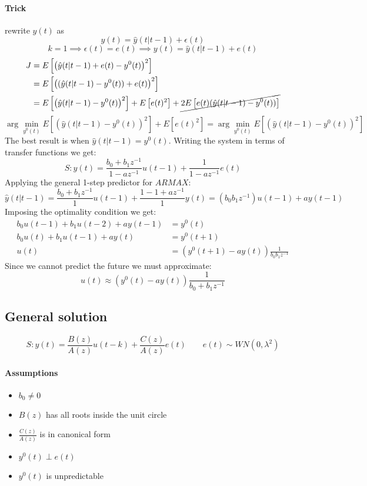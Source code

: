 \documentclass{article}
\begin{document}
\paragraph{Trick} rewrite $y(t)$ as
\[
y(t)=\hat{y}(t|t-1)+\epsilon(t)
\]
\[
k=1 
\implies \epsilon(t)=e(t) 
\implies y(t)=\hat{y}(t|t-1)+e(t)
\]
\begin{align*}
J&=E\left[\left(\hat{y}(t|t-1)+e(t)-y^0(t)\right)^2\right]\\
&=E\left[\left((\hat{y}(t|t-1)-y^0(t))+e(t)\right)^2\right]\\
&=E\left[\left(\hat{y}(t|t-1)-y^0(t)\right)^2\right]
+E\left[e(t)^2\right]
+\cancel{
2E\left[e(t)(\hat{y}(t|t-1)-y^0(t))\right]
}\\
\end{align*}
\[
\arg \min_{y^0(t)} E\left[\left(\hat{y}(t|t-1)-y^0(t)\right)^2\right]
+E\left[e(t)^2\right]
=
\arg \min_{y^0(t)} E\left[\left(\hat{y}(t|t-1)-y^0(t)\right)^2\right]
\]
The best result is when $\hat{y}(t|t-1)=y^0(t)$. Writing the system in terms of transfer functions we get:
\[
S:y(t)=
\frac{b_0+b_1z^{-1}}{1-az^{-1}}
u(t-1)
+
\frac{1}{1-az^{-1}}e(t)
\]
Applying the general 1-step predictor for $ARMAX$:
\[
\hat{y}(t|t-1)=\frac{b_0+b_1z^{-1}}{1}u(t-1)
+
\frac{1-1+az^{-1}}{1}y(t)
=
(b_0b_1z^{-1})u(t-1)+ay(t-1)
\]
Imposing the optimality condition we get:
\begin{align*}
b_0u(t-1)+b_1u(t-2)+ay(t-1)&=y^0(t)\\
b_0u(t)+b_1u(t-1)+ay(t)&=y^0(t+1)\\
u(t)&=\left(y^0(t+1)-ay(t)\right)\frac{1}{b_0b_1z^{-1}}
\end{align*}
Since we cannot predict the future we must approximate:
\[
u(t)
\approx
\left(y^0(t)-ay(t)\right)
\frac{1}{b_0+b_1z^{-1}}
\]
\subsection{General solution}
\[
S:y(t)=
\frac{B(z)}{A(z)}u(t-k)+
\frac{C(z)}{A(z)}e(t)
\qquad
e(t)\sim WN(0,\lambda^2)
\]
\paragraph{Assumptions}
\begin{itemize}
\item $b_0\neq 0$
\item $B(z)$ has all roots inside the unit circle
\item $\frac{C(z)}{A(z)}$ is in canonical form
\item $y^0(t)\perp e(t)$
\item $y^0(t)$ is unpredictable
\end{itemize}
\end{document}
